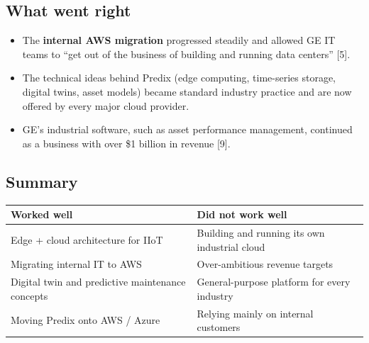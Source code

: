 \documentclass[12pt,a4paper]{article}
\begin{document}
\subsection{What went right}
\begin{itemize}
  \item The \textbf{internal AWS migration} progressed steadily and allowed GE IT teams to ``get out of the business of
        building and running data centers'' [5].
  \item The technical ideas behind Predix (edge computing, time-series storage, digital twins, asset models) became
        standard industry practice and are now offered by every major cloud provider.
  \item GE's industrial software, such as asset performance management, continued as a business with over \$1 billion in revenue [9].
\end{itemize}

\subsection{Summary}
\begin{center}
\begin{tabularx}{\linewidth}{@{}LL@{}}
\toprule
\textbf{Worked well} & \textbf{Did not work well} \\
\midrule
Edge + cloud architecture for IIoT & Building and running its own industrial cloud \\
Migrating internal IT to AWS & Over-ambitious revenue targets \\
Digital twin and predictive maintenance concepts & General-purpose platform for every industry \\
Moving Predix onto AWS / Azure & Relying mainly on internal customers \\
\bottomrule
\end{tabularx}
\end{center}

\end{document}
